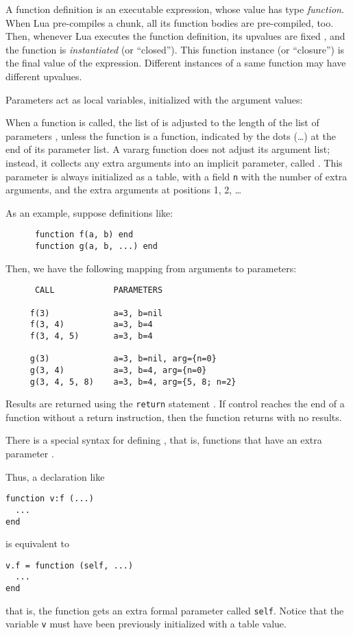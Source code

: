 A function definition is an executable expression,
whose value has type \emph{function}.
When Lua pre-compiles a chunk,
all its function bodies are pre-compiled, too.
Then, whenever Lua executes the function definition,
its upvalues are fixed ,
and the function is \emph{instantiated} (or ``closed'').
This function instance (or ``closure'')
is the final value of the expression.
Different instances of a same function
may have different upvalues.

Parameters act as local variables,
initialized with the argument values:
\begin{Produc}
\end{Produc}
\label{vararg}
When a function is called,
the list of  is adjusted to
the length of the list of parameters ,
unless the function is a  function,
indicated by the dots (\ldots) at the end of its parameter list.
A vararg function does not adjust its argument list;
instead, it collects any extra arguments into an implicit parameter,
called .
This parameter is always initialized as a table,
with a field \verb|n| with the number of extra arguments,
and the extra arguments at positions 1, 2, \ldots

As an example, suppose definitions like:
\begin{verbatim}
      function f(a, b) end
      function g(a, b, ...) end
\end{verbatim}
Then, we have the following mapping from arguments to parameters:
\begin{verbatim}
      CALL            PARAMETERS

     f(3)             a=3, b=nil
     f(3, 4)          a=3, b=4
     f(3, 4, 5)       a=3, b=4

     g(3)             a=3, b=nil, arg={n=0}
     g(3, 4)          a=3, b=4, arg={n=0}
     g(3, 4, 5, 8)    a=3, b=4, arg={5, 8; n=2}
\end{verbatim}

Results are returned using the \verb|return| statement .
If control reaches the end of a function without a return instruction,
then the function returns with no results.

There is a special syntax for defining ,
that is, functions that have an extra parameter .
\begin{Produc}
\end{Produc}%
Thus, a declaration like
\begin{verbatim}
function v:f (...)
  ...
end
\end{verbatim}
is equivalent to
\begin{verbatim}
v.f = function (self, ...)
  ...
end
\end{verbatim}
that is, the function gets an extra formal parameter called \verb|self|.
Notice that the variable \verb|v| must have been
previously initialized with a table value.


